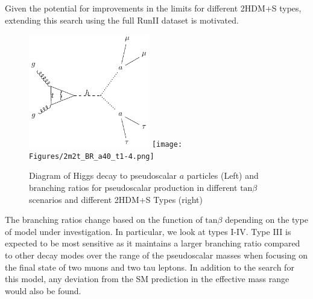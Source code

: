 Given the potential for improvements in the limits for different 2HDM+S types, extending this search using the full RunII dataset is motivated. 


\begin{figure}[ht!b]
  \includegraphics[width=0.47\textwidth]{Figures/feynman_haa.pdf}
  \texttt{[image: Figures/2m2t\_BR\_a40\_t1-4.png]}\\
    \caption{\label{fig:feynman_haa} Diagram of Higgs decay to pseudoscalar $a$ particles (Left) and branching ratios for pseudoscalar production in different $\text{tan}\beta$ scenarios and different 2HDM+S Types (right)}
\end{figure}

The branching ratios change based on the function of $\text{tan}\beta$ depending on the type of model under investigation. In particular, we look at types I-IV. Type III is expected to be most sensitive as it maintains a larger branching ratio compared to other decay modes over the range of the pseudoscalar masses when focusing on the final state of two muons and two tau leptons. In addition to the search for this model, any deviation from the SM prediction in the effective mass range would also be found.

